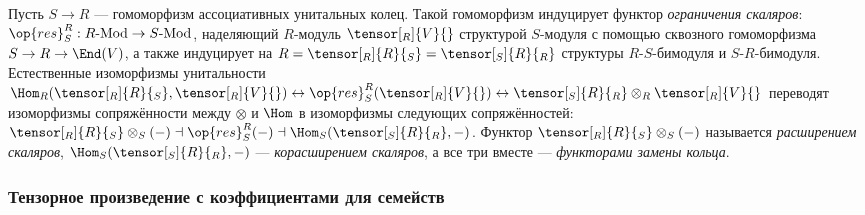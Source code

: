 \documentclass[
	extrafontsizes,
	11pt,
	hyphens,
]{memoir}
\begin{document}
\begin{observation}
Пусть \(S \to R\) --- гомоморфизм ассоциативных унитальных колец.
Такой гомоморфизм индуцирует функтор \emph{ограничения скаляров}: \(\op{res}^R_S : R\text{-}\mathrm{Mod} \to S\text{-}\mathrm{Mod}\), наделяющий \(R\)-модуль \(\tensor[_R]{V}{}\) структурой \(S\)-модуля с помощью сквозного гомоморфизма \(S \to R \to \End(V)\),
а также индуцирует на \(R = \tensor[_R]{R}{_S} = \tensor[_S]{R}{_R}\) структуры \(R\)-\(S\)-би\-мо\-ду\-ля и \(S\)-\(R\)-би\-мо\-ду\-ля.
Естественные изоморфизмы унитальности
\(\Hom_R(\tensor[_R]{R}{_S}, \tensor[_R]{V}{}) \leftrightarrow \op{res}^R_S(\tensor[_R]{V}{}) \leftrightarrow \tensor[_S]{R}{_R} \otimes_R \tensor[_R]{V}{}\)
переводят изоморфизмы сопряжённости между \(\otimes\) и \(\Hom\) в изоморфизмы следующих сопряжённостей:
\(
\tensor[_R]{R}{_S} \otimes_S (-)
\dashv
\op{res}^R_S(-)
\dashv
\Hom_S(\tensor[_S]{R}{_R}, -)
\).
Функтор \(\tensor[_R]{R}{_S} \otimes_S (-)\) называется \emph{расширением скаляров},
\(\Hom_S(\tensor[_S]{R}{_R}, -)\) --- \emph{корасширением скаляров},
а все три вместе --- \emph{функторами замены кольца}.
\end{observation}


\subsubsection{Тензорное произведение с коэффициентами для семейств}

\end{document}
